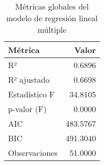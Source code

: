 \begin{table}
\caption{Métricas globales del modelo de regresión lineal múltiple}
\label{tab:metricas_regresion}
\begin{tabular}{lr}
\toprule
Métrica & Valor \\
\midrule
R² & 0.6896 \\
R² ajustado & 0.6698 \\
Estadístico F & 34.8105 \\
p-valor (F) & 0.0000 \\
AIC & 483.5767 \\
BIC & 491.3040 \\
Observaciones & 51.0000 \\
\bottomrule
\end{tabular}
\end{table}

